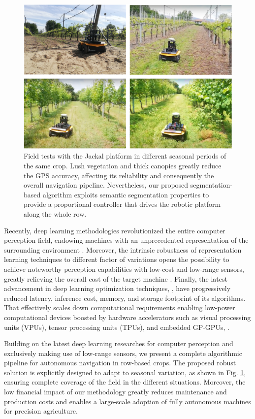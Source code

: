 \documentclass[journal]{IEEEtran}
\begin{document}
\begin{figure}[!t]
\centering
\includegraphics[width=1.0\columnwidth]{intro_2.png}
\caption{Field tests with the Jackal platform in different seasonal periods of the same crop. Lush vegetation and thick canopies greatly reduce the GPS accuracy, affecting its reliability and  consequently the overall navigation pipeline. Nevertheless, our proposed segmentation-based algorithm exploits semantic segmentation properties to provide a proportional controller that drives the robotic platform along the whole row.}
\label{fig:seasonal_variation}
\end{figure}

Recently, deep learning methodologies \cite{hinton2015nature} revolutionized the entire computer perception field, endowing machines with an unprecedented representation of the surrounding environment \cite{grigorescu2020survey}. Moreover, the intrinsic robustness of representation learning techniques to different factor of variations opens the possibility to achieve noteworthy perception capabilities with low-cost and low-range sensors, greatly relieving the overall cost of the target machine \cite{boschi2020cost, martini2022position}. Finally, the latest advancement in deep learning optimization techniques, \cite{jacob2018quantization}, have progressively reduced latency, inference cost, memory, and storage footprint of its algorithms. That effectively scales down computational requirements enabling low-power computational devices boosted by hardware accelerators such as visual processing units (VPUs), tensor processing units (TPUs), and embedded GP-GPUs, \cite{mazzia2020real}.

Building on the latest deep learning researches for computer perception and exclusively making use of low-range sensors, we present a complete algorithmic pipeline for autonomous navigation in row-based crops. The proposed robust solution is explicitly designed to adapt to seasonal variation, as shown in Fig. \ref{fig:seasonal_variation}, ensuring complete coverage of the field in the different situations. Moreover, the low financial impact of our methodology greatly reduces maintenance and production costs and enables a large-scale adoption of fully autonomous machines for precision agriculture.
\end{document}
